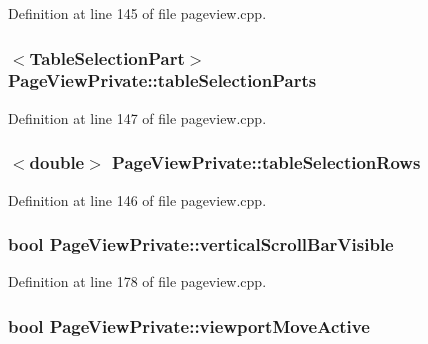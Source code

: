 Definition at line 145 of file pageview.\+cpp.

\hypertarget{classPageViewPrivate_aec476c0b74867740803d4ba34393b154}{
\subsubsection[{table\+Selection\+Parts}]{$<${\bf Table\+Selection\+Part}$>$ Page\+View\+Private\+::table\+Selection\+Parts}}\label{classPageViewPrivate_aec476c0b74867740803d4ba34393b154}


Definition at line 147 of file pageview.\+cpp.

\hypertarget{classPageViewPrivate_afa6ab874498223c0f7788831a67ef007}{
\subsubsection[{table\+Selection\+Rows}]{$<$double$>$ Page\+View\+Private\+::table\+Selection\+Rows}}\label{classPageViewPrivate_afa6ab874498223c0f7788831a67ef007}


Definition at line 146 of file pageview.\+cpp.

\hypertarget{classPageViewPrivate_ae6defa78192680c6f0943b1d2b2aafa8}{
\subsubsection[{vertical\+Scroll\+Bar\+Visible}]{\setlength{\rightskip}{0pt plus 5cm}bool Page\+View\+Private\+::vertical\+Scroll\+Bar\+Visible}}\label{classPageViewPrivate_ae6defa78192680c6f0943b1d2b2aafa8}


Definition at line 178 of file pageview.\+cpp.

\hypertarget{classPageViewPrivate_acc47dfc95cad4f126c4dbd3e8f31e43b}{
\subsubsection[{viewport\+Move\+Active}]{\setlength{\rightskip}{0pt plus 5cm}bool Page\+View\+Private\+::viewport\+Move\+Active}}\label{classPageViewPrivate_acc47dfc95cad4f126c4dbd3e8f31e43b}


